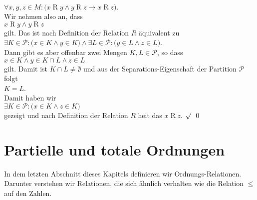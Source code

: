 \begin{enumerate}
      \\[0.2cm]
      \hspace*{1.3cm}
      $\forall x,y,z \in M:\bigl( x \mathop{R} y \wedge y \mathop{R} z \rightarrow x \mathop{R} z\bigr)$.
      \\[0.2cm]
      Wir nehmen also an, dass 
      \\[0.2cm]
      \hspace*{1.3cm}
      $x \mathop{R} y \wedge y \mathop{R} z$
      \\[0.2cm]
      gilt.  Das ist nach Definition der Relation $R$ \"{a}quivalent zu
      \\[0.2cm]
      \hspace*{1.3cm}
      $\exists K \in \mathcal{P}: \bigl(x \in K \wedge y \in K\bigr) \wedge 
       \exists L \in \mathcal{P}: \bigl(y \in L \wedge z \in L\bigr)$.
      \\[0.2cm]
      Dann gibt es aber offenbar zwei Mengen $K,L\in\mathcal{P}$, so dass
      \\[0.2cm]
      \hspace*{1.3cm}
      $x \in K \wedge y \in K \cap L \wedge z \in L$
      \\[0.2cm]
      gilt.  Damit ist $K \cap L \not= \emptyset$ und aus der 
      Separations-Eigenschaft der Partition $\mathcal{P}$ folgt 
      \\[0.2cm]
      \hspace*{1.3cm}
      $K = L$.
      \\[0.2cm]
      Damit haben wir 
      \\[0.2cm]
      \hspace*{1.3cm}
      $\exists K \in \mathcal{P}: \bigl(x \in K \wedge z \in K\bigr)$
      \\[0.2cm]
      gezeigt und nach Definition der Relation $R$ hei\3t das 
      $x \mathop{R} z$. $\surd$
      \qed
\end{enumerate}



\section{Partielle und totale Ordnungen}
In dem letzten Abschnitt dieses Kapitels definieren wir Ordnungs-Relationen.  Darunter verstehen wir
Relationen, die sich \"{a}hnlich verhalten wie die Relation $\leq$ auf den Zahlen.

